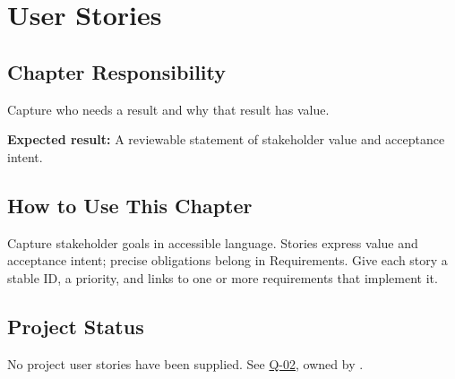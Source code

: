 \chapter{User Stories}
\section{Chapter Responsibility}
\label{Section:UserStoriesResponsibility}
Capture who needs a result and why that result has value.

\noindent\textbf{Expected result:} A reviewable statement of stakeholder value and acceptance intent.

\section{How to Use This Chapter}
Capture stakeholder goals in accessible language. Stories express value and
acceptance intent; precise obligations belong in Requirements. Give each story
a stable ID, a priority, and links to one or more requirements that implement it.


\section{Project Status}
No project user stories have been supplied.
See \hyperref[Question:Q-02]{Q-02}, owned by \DocumentOwner.
